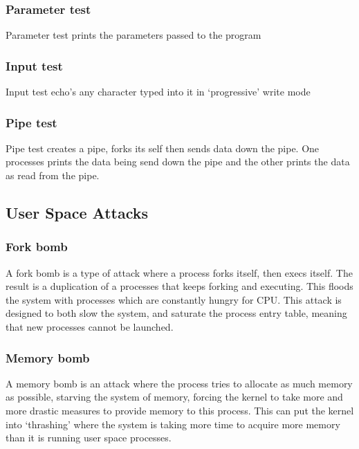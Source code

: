 \documentclass[a4paper]{report}
\begin{document}
\subsubsection{Parameter test}

Parameter test prints the parameters passed to the program

\subsubsection{Input test}

Input test echo's any character typed into it in `progressive' write mode

\subsubsection{Pipe test}

Pipe test creates a pipe, forks its self then sends data down the pipe.
One processes prints the data being send down the pipe and the other prints the data as read from the pipe.

\subsection{User Space Attacks}

\subsubsection{Fork bomb}

A fork bomb is a type of attack where a process forks itself, then execs itself. The result is a duplication of a processes that keeps forking and executing. This floods the system with processes which are constantly hungry for CPU. This attack is designed to both slow the system, and saturate the process entry table, meaning that new processes cannot be launched.

\subsubsection{Memory bomb}

A memory bomb is an attack where the process tries to allocate as much memory as possible, starving the system of memory, forcing the kernel to take more and more drastic measures to provide memory to this process. This can put the kernel into `thrashing' where the system is taking more time to acquire more memory than it is running user space processes.
\end{document}
